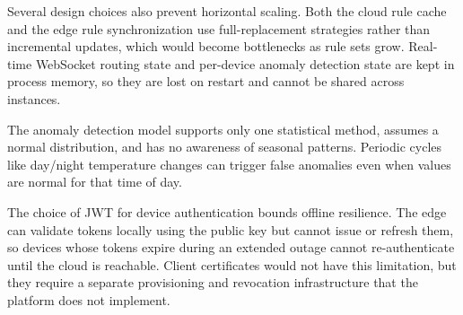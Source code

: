 Several design choices also prevent horizontal scaling. Both the cloud rule cache and the edge rule synchronization use full-replacement strategies rather than incremental updates, which would become bottlenecks as rule sets grow. Real-time WebSocket routing state and per-device anomaly detection state are kept in process memory, so they are lost on restart and cannot be shared across instances.

The anomaly detection model supports only one statistical method, assumes a normal distribution, and has no awareness of seasonal patterns. Periodic cycles like day/night temperature changes can trigger false anomalies even when values are normal for that time of day.

The choice of \gls{JWT} for device authentication bounds offline resilience. The edge can validate tokens locally using the public key but cannot issue or refresh them, so devices whose tokens expire during an extended outage cannot re-authenticate until the cloud is reachable. Client certificates would not have this limitation, but they require a separate provisioning and revocation infrastructure that the platform does not implement.
